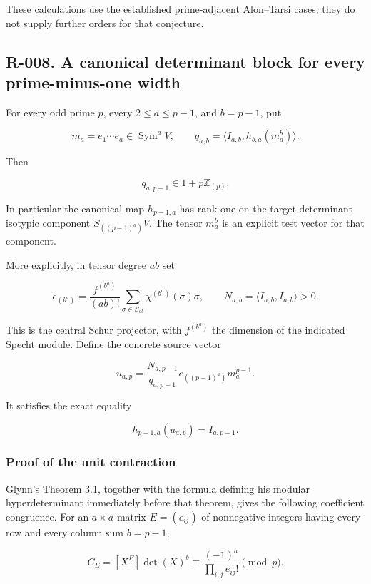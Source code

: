 \documentclass[
  10pt,
]{article}
\begin{document}
These calculations use the established prime-adjacent Alon--Tarsi cases;
they do not supply further orders for that conjecture.

\subsection{R-008. A canonical determinant block for every
prime-minus-one
width}\label{r-008.-a-canonical-determinant-block-for-every-prime-minus-one-width}

For every odd prime \(p\), every \(2\le a\le p-1\), and \(b=p-1\), put

\[
 m_a=e_1\cdots e_a\in\operatorname{Sym}^aV,
 \qquad
 q_{a,b}=\langle I_{a,b},h_{b,a}(m_a^b)\rangle.
\]

Then

\[
 \boxed{q_{a,p-1}\in1+p\mathbb Z_{(p)}.}
 \tag{R-008a}
\]

In particular the canonical map \(h_{p-1,a}\) has rank one on the target
determinant isotypic component \(S_{((p-1)^a)}V\). The tensor \(m_a^b\)
is an explicit test vector for that component.

More explicitly, in tensor degree \(ab\) set

\[
 e_{(b^a)}=\frac{f^{(b^a)}}{(ab)!}
       \sum_{\sigma\in S_{ab}}\chi^{(b^a)}(\sigma)\sigma,
 \qquad N_{a,b}=\langle I_{a,b},I_{a,b}\rangle>0.
\]

This is the central Schur projector, with \(f^{(b^a)}\) the dimension of
the indicated Specht module. Define the concrete source vector

\[
 u_{a,p}=\frac{N_{a,p-1}}{q_{a,p-1}}
             e_{((p-1)^a)}m_a^{p-1}.
 \tag{B5}
\]

It satisfies the exact equality

\[
 h_{p-1,a}(u_{a,p})=I_{a,p-1}.
 \tag{R-008b}
\]

\subsubsection{Proof of the unit
contraction}\label{proof-of-the-unit-contraction}

Glynn's Theorem 3.1, together with the formula defining his modular
hyperdeterminant immediately before that theorem, gives the following
coefficient congruence. For an \(a\times a\) matrix \(E=(e_{ij})\) of
nonnegative integers having every row and every column sum \(b=p-1\),

\[
 C_E=[X^E]\det(X)^b
       \equiv\frac{(-1)^a}{\prod_{i,j}e_{ij}!}\pmod p.
 \tag{B6}
\]
\end{document}
